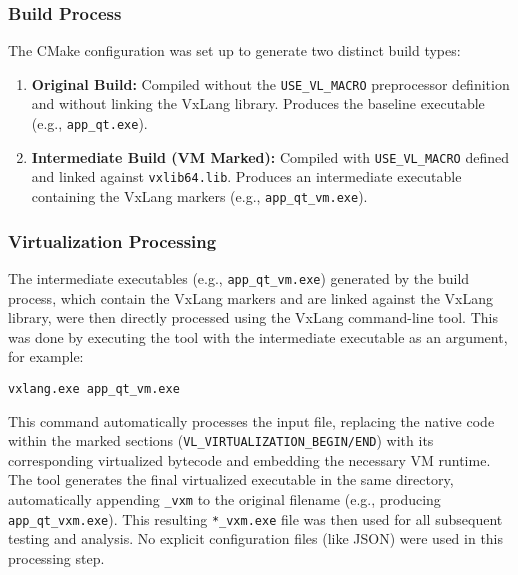 \subsubsection{Build Process} The CMake configuration was set up to generate two distinct build types:
\begin{enumerate}
    \item \textbf{Original Build:} Compiled without the \texttt{USE\_VL\_MACRO} preprocessor definition and without linking the VxLang library. Produces the baseline executable (e.g., \texttt{app\_qt.exe}).
    \item \textbf{Intermediate Build (VM Marked):} Compiled with \texttt{USE\_VL\_MACRO} defined and linked against \texttt{vxlib64.lib}. Produces an intermediate executable containing the VxLang markers (e.g., \texttt{app\_qt\_vm.exe}).
\end{enumerate}

\subsubsection{Virtualization Processing}
The intermediate executables (e.g., \texttt{app\_qt\_vm.exe}) generated by the build process, which contain the VxLang markers and are linked against the VxLang library, were then directly processed using the VxLang command-line tool. This was done by executing the tool with the intermediate executable as an argument, for example:

\begin{verbatim}
vxlang.exe app_qt_vm.exe
\end{verbatim}

This command automatically processes the input file, replacing the native code within the marked sections (\texttt{VL\_VIRTUALIZATION\_BEGIN/END}) with its corresponding virtualized bytecode and embedding the necessary VM runtime. The tool generates the final virtualized executable in the same directory, automatically appending \texttt{\_vxm} to the original filename (e.g., producing \texttt{app\_qt\_vxm.exe}). This resulting \texttt{*\_vxm.exe} file was then used for all subsequent testing and analysis. No explicit configuration files (like JSON) were used in this processing step.

